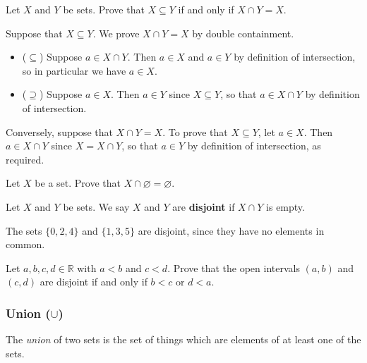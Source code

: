 \begin{proposition}
\label{propSubsetFromIntersection}
Let $X$ and $Y$ be sets. Prove that $X \subseteq Y$ if and only if $X \cap Y = X$.
\end{proposition}

\begin{cproof}
Suppose that $X \subseteq Y$. We prove $X \cap Y = X$ by double containment.
\begin{itemize}
\item ($\subseteq$) Suppose $a \in X \cap Y$. Then $a \in X$ and $a \in Y$ by definition of intersection, so in particular we have $a \in X$.
\item ($\supseteq$) Suppose $a \in X$. Then $a \in Y$ since $X \subseteq Y$, so that $a \in X \cap Y$ by definition of intersection.
\end{itemize}

Conversely, suppose that $X \cap Y = X$. To prove that $X \subseteq Y$, let $a \in X$. Then $a \in X \cap Y$ since $X = X \cap Y$, so that $a \in Y$ by definition of intersection, as required.
\end{cproof}

\begin{exercise}
Let $X$ be a set. Prove that $X \cap \varnothing = \varnothing$.
\end{exercise}

\begin{definition}
\label{defDisjoint}
Let $X$ and $Y$ be sets. We say $X$ and $Y$ are \textbf{disjoint} if $X \cap Y$ is empty.
\end{definition}

\begin{example}
The sets $\{ 0,2,4 \}$ and $\{ 1,3,5 \}$ are disjoint, since they have no elements in common.
\end{example}

\begin{exercise}
Let $a,b,c,d \in \mathbb{R}$ with $a<b$ and $c<d$. Prove that the open intervals $(a,b)$ and $(c,d)$ are disjoint if and only if $b<c$ or $d<a$.
\end{exercise}

\subsubsection*{Union ($\cup$)}
The \textit{union} of two sets is the set of things which are elements of at least one of the sets.

